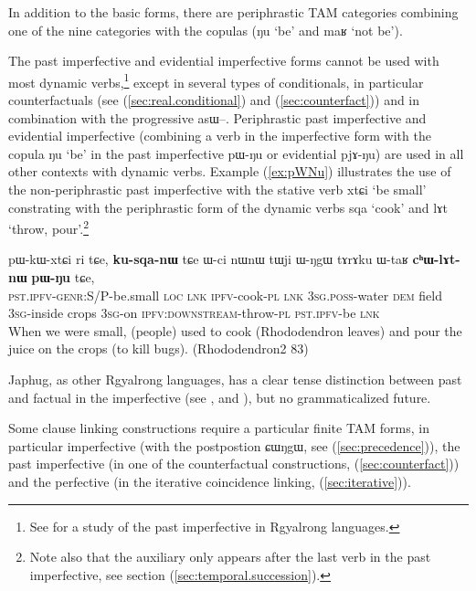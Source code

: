 \documentclass[oldfontcommands,oneside,a4paper,11pt]{article}
\newcommand{\ipa}[1]{{\phon \mbox{#1}}} %
\newcommand{\refb}[1]{(\ref{#1})}
\begin{document}
In addition to the basic forms, there are periphrastic TAM categories combining one of the nine categories with the copulas (\ipa{ŋu} `be' and \ipa{maʁ} `not be').


The past imperfective  and   evidential imperfective forms cannot be used with most dynamic verbs,\footnote{ See \citet{lin11direction} for a study of the past imperfective in Rgyalrong languages. } except in    several types of conditionals, in particular counterfactuals (see \refb{sec:real.conditional} and \refb{sec:counterfact}) and in combination with the progressive  \ipa{asɯ}--. Periphrastic past imperfective and evidential imperfective (combining a verb in the imperfective form with the copula \ipa{ŋu} `be' in the past imperfective \ipa{pɯ-ŋu} or evidential \ipa{pjɤ-ŋu}) are used in all other contexts with dynamic verbs. Example \refb{ex:pWNu} illustrates the use of the non-periphrastic past imperfective with the stative verb \ipa{xtɕi} `be small' constrating with  the periphrastic form of the dynamic verbs \ipa{sqa} `cook' and \ipa{lɤt} `throw, pour'.\footnote{Note also that the auxiliary only appears after the last verb in the past imperfective, see section \refb{sec:temporal.succession}. }

\begin{exe}
\ex \label{ex:pWNu}
\gll
\ipa{pɯ-kɯ-xtɕi}  	\ipa{ri}  	\ipa{tɕe,}  	\textbf{\ipa{ku-sqa-nɯ}}  	\ipa{tɕe}  	\ipa{ɯ-ci}  	\ipa{nɯnɯ}  	\ipa{tɯji}  	\ipa{ɯ-ŋgɯ}  	\ipa{tɤrɤku}  	\ipa{ɯ-taʁ}  	\textbf{\ipa{cʰɯ-lɤt-nɯ}}  	\textbf{\ipa{pɯ-ŋu}}  	\ipa{tɕe,}   \\
\textsc{pst.ipfv-genr}:S/P-be.small  \textsc{loc} \textsc{lnk} \textsc{ipfv}-cook-\textsc{pl} \textsc{lnk} \textsc{3sg.poss}-water \textsc{dem} field \textsc{3sg}-inside crops \textsc{3sg}-on \textsc{ipfv:downstream}-throw-\textsc{pl} \textsc{pst.ipfv}-be \textsc{lnk}\\
  \glt When we were small, (people) used to cook (Rhododendron leaves) and pour the juice on the crops (to kill bugs). (Rhododendron2 83)
  \end{exe}  
  
 Japhug, as other Rgyalrong languages, has a clear tense distinction between past and factual in the imperfective (see \citealt{jackson00puxi}, \citealt{linyj03tense} and \citealt[371-392]{jacques04these}), but no grammaticalized future. 
 
 Some clause linking constructions require a particular finite TAM forms, in particular imperfective (with the postpostion \ipa{ɕɯŋgɯ}, see \refb{sec:precedence}), the past imperfective (in one of the counterfactual constructions, \refb{sec:counterfact}) and the perfective (in the iterative coincidence linking, \refb{sec:iterative}).
  
\end{document}
